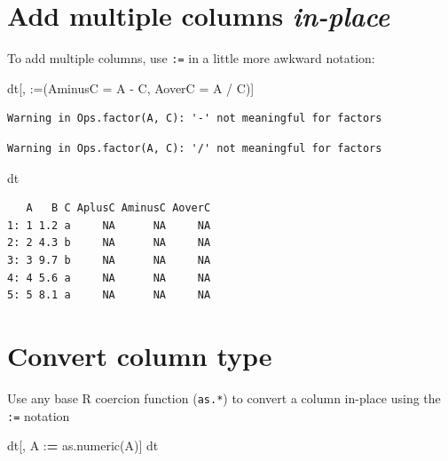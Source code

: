 \documentclass[
]{book}
\newenvironment{Shaded}{\begin{snugshade}}{\end{snugshade}}
\newcommand{\AttributeTok}[1]{\textcolor[rgb]{0.77,0.63,0.00}{#1}}
\newcommand{\ErrorTok}[1]{\textcolor[rgb]{0.64,0.00,0.00}{\textbf{#1}}}
\newcommand{\FunctionTok}[1]{\textcolor[rgb]{0.00,0.00,0.00}{#1}}
\newcommand{\NormalTok}[1]{#1}
\newcommand{\SpecialCharTok}[1]{\textcolor[rgb]{0.00,0.00,0.00}{#1}}
\newcommand{\StringTok}[1]{\textcolor[rgb]{0.31,0.60,0.02}{#1}}
\begin{document}
\hypertarget{add-multiple-columns-in-place}{%
\section{\texorpdfstring{Add multiple columns \textbf{\emph{in-place}}}{Add multiple columns in-place}}\label{add-multiple-columns-in-place}}

To add multiple columns, use \texttt{:=} in a little more awkward notation:

\begin{Shaded}
\begin{Highlighting}[]
\NormalTok{dt[, }\StringTok{\textasciigrave{}}\AttributeTok{:=}\StringTok{\textasciigrave{}}\NormalTok{(}\AttributeTok{AminusC =}\NormalTok{ A }\SpecialCharTok{{-}}\NormalTok{ C, }\AttributeTok{AoverC =}\NormalTok{ A }\SpecialCharTok{/}\NormalTok{ C)]}
\end{Highlighting}
\end{Shaded}

\begin{verbatim}
Warning in Ops.factor(A, C): '-' not meaningful for factors
\end{verbatim}

\begin{verbatim}
Warning in Ops.factor(A, C): '/' not meaningful for factors
\end{verbatim}

\begin{Shaded}
\begin{Highlighting}[]
\NormalTok{dt}
\end{Highlighting}
\end{Shaded}

\begin{verbatim}
   A   B C AplusC AminusC AoverC
1: 1 1.2 a     NA      NA     NA
2: 2 4.3 b     NA      NA     NA
3: 3 9.7 b     NA      NA     NA
4: 4 5.6 a     NA      NA     NA
5: 5 8.1 a     NA      NA     NA
\end{verbatim}

\hypertarget{convert-column-type}{%
\section{Convert column type}\label{convert-column-type}}

Use any base R coercion function (\texttt{as.*}) to convert a column in-place using the \texttt{:=} notation

\begin{Shaded}
\begin{Highlighting}[]
\NormalTok{dt[, A }\SpecialCharTok{:}\ErrorTok{=} \FunctionTok{as.numeric}\NormalTok{(A)]}
\NormalTok{dt}
\end{Highlighting}
\end{Shaded}
\end{document}
